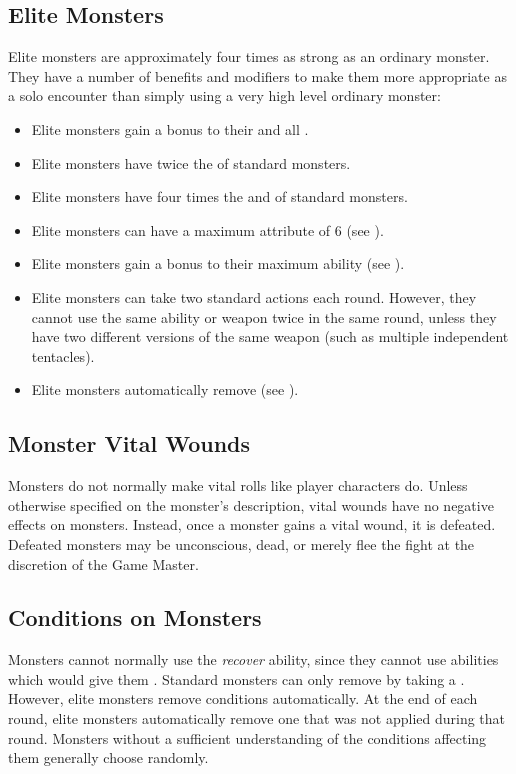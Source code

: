     \subsection{Elite Monsters}\label{Elite Monsters}
        Elite monsters are approximately four times as strong as an ordinary monster.
        They have a number of benefits and modifiers to make them more appropriate as a solo encounter than simply using a very high level ordinary monster:
        \begin{itemize}
            \item Elite monsters gain a  bonus to their  and all .
            \item Elite monsters have twice the  of standard monsters.
            \item Elite monsters have four times the  and  of standard monsters.
            \item Elite monsters can have a maximum attribute of 6 (see ).
            \item Elite monsters gain a  bonus to their maximum ability  (see ).
            \item Elite monsters can take two standard actions each round. However, they cannot use the same ability or weapon twice in the same round, unless they have two different versions of the same weapon (such as multiple independent tentacles).
            \item Elite monsters automatically remove  (see ).
        \end{itemize}

        \subsection{Monster Vital Wounds}
            Monsters do not normally make vital rolls like player characters do.
            Unless otherwise specified on the monster's description, vital wounds have no negative effects on monsters.
            Instead, once a monster gains a vital wound, it is defeated.
            Defeated monsters may be unconscious, dead, or merely flee the fight at the discretion of the Game Master.

        \subsection{Conditions on Monsters}\label{Conditions on Monsters}
            Monsters cannot normally use the \textit{recover} ability, since they cannot use abilities which would give them .
            Standard monsters can only remove  by taking a .
            However, elite monsters remove conditions automatically.
            At the end of each round, elite monsters automatically remove one  that was not applied during that round.
            Monsters without a sufficient understanding of the conditions affecting them generally choose randomly.

